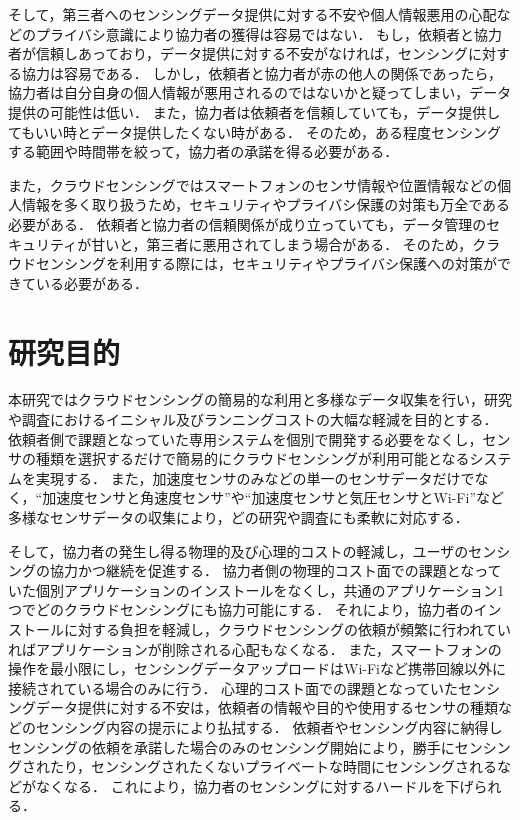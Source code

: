 そして，第三者へのセンシングデータ提供に対する不安や個人情報悪用の心配などのプライバシ意識により協力者の獲得は容易ではない．
もし，依頼者と協力者が信頼しあっており，データ提供に対する不安がなければ，センシングに対する協力は容易である．
しかし，依頼者と協力者が赤の他人の関係であったら，協力者は自分自身の個人情報が悪用されるのではないかと疑ってしまい，データ提供の可能性は低い．
また，協力者は依頼者を信頼していても，データ提供してもいい時とデータ提供したくない時がある．
そのため，ある程度センシングする範囲や時間帯を絞って，協力者の承諾を得る必要がある．

また，クラウドセンシングではスマートフォンのセンサ情報や位置情報などの個人情報を多く取り扱うため，セキュリティやプライバシ保護の対策も万全である必要がある．
依頼者と協力者の信頼関係が成り立っていても，データ管理のセキュリティが甘いと，第三者に悪用されてしまう場合がある．
そのため，クラウドセンシングを利用する際には，セキュリティやプライバシ保護への対策ができている必要がある．



\section{研究目的}
\label{sec:thesis}

本研究ではクラウドセンシングの簡易的な利用と多様なデータ収集を行い，研究や調査におけるイニシャル及びランニングコストの大幅な軽減を目的とする．
依頼者側で課題となっていた専用システムを個別で開発する必要をなくし，センサの種類を選択するだけで簡易的にクラウドセンシングが利用可能となるシステムを実現する．
また，加速度センサのみなどの単一のセンサデータだけでなく，“加速度センサと角速度センサ”や“加速度センサと気圧センサとWi-Fi”など多様なセンサデータの収集により，どの研究や調査にも柔軟に対応する．

そして，協力者の発生し得る物理的及び心理的コストの軽減し，ユーザのセンシングの協力かつ継続を促進する．
協力者側の物理的コスト面での課題となっていた個別アプリケーションのインストールをなくし，共通のアプリケーション1つでどのクラウドセンシングにも協力可能にする．
それにより，協力者のインストールに対する負担を軽減し，クラウドセンシングの依頼が頻繁に行われていればアプリケーションが削除される心配もなくなる．
また，スマートフォンの操作を最小限にし，センシングデータアップロードはWi-Fiなど携帯回線以外に接続されている場合のみに行う．
心理的コスト面での課題となっていたセンシングデータ提供に対する不安は，依頼者の情報や目的や使用するセンサの種類などのセンシング内容の提示により払拭する．
依頼者やセンシング内容に納得しセンシングの依頼を承諾した場合のみのセンシング開始により，勝手にセンシングされたり，センシングされたくないプライベートな時間にセンシングされるなどがなくなる．
これにより，協力者のセンシングに対するハードルを下げられる．

